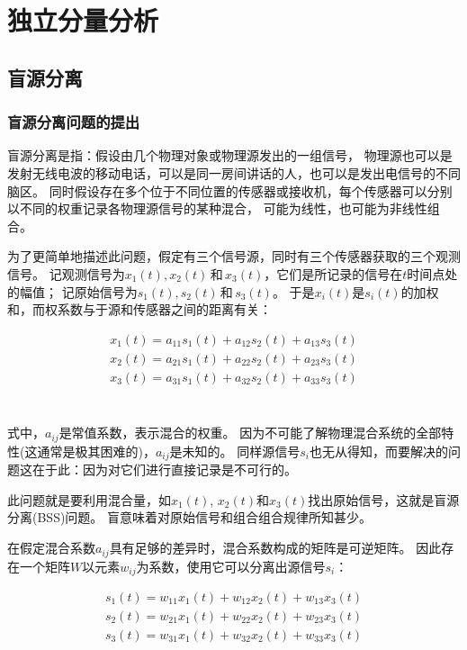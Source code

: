 ﻿%

\chapter{独立分量分析}
\label{chap02}
\section{盲源分离}

\subsection{盲源分离问题的提出}
盲源分离是指：假设由几个物理对象或物理源发出的一组信号，
物理源也可以是发射无线电波的移动电话，可以是同一房间讲话的人，也可以是发出电信号的不同脑区。
同时假设存在多个位于不同位置的传感器或接收机，每个传感器可以分别以不同的权重记录各物理源信号的某种混合，
可能为线性，也可能为非线性组合。

为了更简单地描述此问题，假定有三个信号源，同时有三个传感器获取的三个观测信号。
记观测信号为$x_1(t), x_2(t) \,\mbox{和}\, x_3(t)$，它们是所记录的信号在$t$时间点处的幅值；
记原始信号为$s_1(t), s_2(t)\,和\,s_3(t)$。
于是$x_i(t)$是$s_i(t)$的加权和，而权系数与于源和传感器之间的距离有关：

\parbox{10cm}{
\begin{eqnarray*}
x_1(t)=a_{11}s_1(t)+a_{12}s_2(t)+a_{13}s_3(t) \\
x_2(t)=a_{21}s_1(t)+a_{22}s_2(t)+a_{23}s_3(t) \\
x_3(t)=a_{31}s_1(t)+a_{32}s_2(t)+a_{33}s_3(t) \\
\end{eqnarray*}
}\hfill
\parbox{3cm}{\begin{eqnarray} \label{bss_compose}\end{eqnarray}}

式中，$a_{ij}$是常值系数，表示混合的权重。
因为不可能了解物理混合系统的全部特性(这通常是极其困难的)，$a_{ij}$是未知的。
同样源信号$s_i$也无从得知，而要解决的问题这在于此：因为对它们进行直接记录是不可行的。

此问题就是要利用混合量，如$x_1(t)$, $x_2(t)$和$x_3(t)$找出原始信号，这就是盲源分离(BSS)问题。
盲意味着对原始信号和组合组合规律所知甚少。

在假定混合系数$a_{ij}$具有足够的差异时，混合系数构成的矩阵是可逆矩阵。
因此存在一个矩阵$W$以元素$w_{ij}$为系数，使用它可以分离出源信号$s_i$：

\parbox{10cm}{
\begin{eqnarray*}
s_1(t)=w_{11}x_1(t)+w_{12}x_2(t)+w_{13}x_3(t) \\
s_2(t)=w_{21}x_1(t)+w_{22}x_2(t)+w_{23}x_3(t) \\
s_3(t)=w_{31}x_1(t)+w_{32}x_2(t)+w_{33}x_3(t) \\
\end{eqnarray*}
}\hfill
\parbox{3cm}{\begin{eqnarray}\label{bss_slover} \end{eqnarray}}

